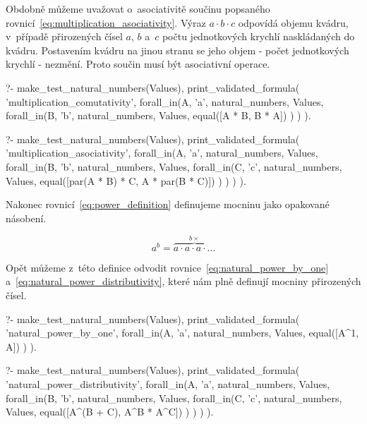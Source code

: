 Obdobně můžeme uvažovat o~asociativitě součinu popsaného rovnicí~\eqref{eq:multiplication_asociativity}. Výraz \(a \cdot b \cdot c\) odpovídá objemu kvádru, v~případě přirozených čísel \(a\), \(b\) a~\(c\) počtu jednotkových krychlí naskládaných do kvádru. Postavením kvádru na jinou stranu se jeho objem - počet jednotkových krychlí - nezmění. Proto součin musí být asociativní operace.

\begin{fact}
\begin{prolog}
?-	make_test_natural_numbers(Values),
	print_validated_formula(
		'multiplication_comutativity',
		forall_in(A, 'a', natural_numbers, Values,
			forall_in(B, 'b', natural_numbers, Values,
				equal([A * B, B * A])
			)
		)
	).				
\end{prolog}
\begin{prolog}
?-	make_test_natural_numbers(Values),
	print_validated_formula(
		'multiplication_asociativity',
		forall_in(A, 'a', natural_numbers, Values,
			forall_in(B, 'b', natural_numbers, Values,
				forall_in(C, 'c', natural_numbers, Values,
					equal([par(A * B) * C, A * par(B * C)])
				)
			)
		)
	).				
\end{prolog}
\end{fact}

Nakonec rovnicí~\eqref{eq:power_definition} definujeme mocninu jako opakované násobení.

\begin{equation}
\label{eq:power_definition}
a^b = \overbrace{a \cdot a \cdot a \cdot ...}^{b \times}
\end{equation}

Opět můžeme z~této definice odvodit rovnice~\eqref{eq:natural_power_by_one} a~\eqref{eq:natural_power_distributivity}, které nám plně definují mocniny přirozených čísel.

\begin{fact}
\begin{prolog}
?-	make_test_natural_numbers(Values),
	print_validated_formula(
		'natural_power_by_one',
		forall_in(A, 'a', natural_numbers, Values,
			equal([A^1, A])
		)
	).				
\end{prolog}
\begin{prolog}
?-	make_test_natural_numbers(Values),
	print_validated_formula(
		'natural_power_distributivity',
		forall_in(A, 'a', natural_numbers, Values,
			forall_in(B, 'b', natural_numbers, Values,
				forall_in(C, 'c', natural_numbers, Values,
					equal([A^(B + C), A^B * A^C])
				)
			)
		)
	).				
\end{prolog}
\end{fact}

